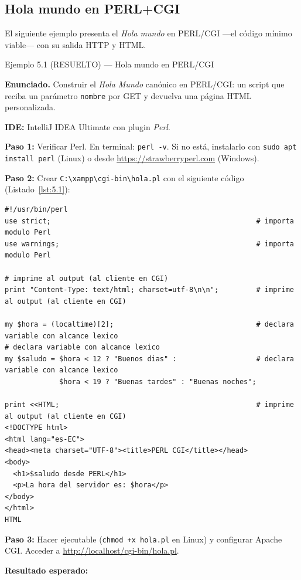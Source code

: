 \documentclass[11pt,a4paper,openany]{book}
\begin{document}
\subsection{Hola mundo en PERL+CGI}

El siguiente ejemplo presenta el \emph{Hola mundo} en
PERL/CGI ---el código mínimo viable--- con su salida HTTP y HTML.


\begin{cajaejemplo}{Ejemplo 5.1 (RESUELTO) --- Hola mundo en PERL/CGI}


\textbf{Enunciado.} Construir el \emph{Hola Mundo} canónico en PERL/CGI: un script que reciba un parámetro \texttt{nombre} por GET y devuelva una página HTML personalizada.

\textbf{IDE:} IntelliJ IDEA Ultimate con plugin \emph{Perl}.

\textbf{Paso 1:} Verificar Perl. En terminal: \texttt{perl -v}. Si no
está, instalarlo con \texttt{sudo apt install perl} (Linux) o desde
\url{https://strawberryperl.com} (Windows).

\textbf{Paso 2:} Crear \texttt{C:\textbackslash{}xampp\textbackslash{}cgi-bin\textbackslash{}hola.pl}
con el siguiente código (Listado~\ref{lst:5.1}):

\begin{lstlisting}[style=perl,caption={hola.pl},label=lst:5.1]
#!/usr/bin/perl
use strict;                                                 # importa modulo Perl
use warnings;                                               # importa modulo Perl

# imprime al output (al cliente en CGI)
print "Content-Type: text/html; charset=utf-8\n\n";         # imprime al output (al cliente en CGI)

my $hora = (localtime)[2];                                  # declara variable con alcance lexico
# declara variable con alcance lexico
my $saludo = $hora < 12 ? "Buenos dias" :                   # declara variable con alcance lexico
             $hora < 19 ? "Buenas tardes" : "Buenas noches";

print <<HTML;                                               # imprime al output (al cliente en CGI)
<!DOCTYPE html>
<html lang="es-EC">
<head><meta charset="UTF-8"><title>PERL CGI</title></head>
<body>
  <h1>$saludo desde PERL</h1>
  <p>La hora del servidor es: $hora</p>
</body>
</html>
HTML
\end{lstlisting}

\textbf{Paso 3:} Hacer ejecutable
(\texttt{chmod +x hola.pl} en Linux) y configurar Apache CGI.
Acceder a \url{http://localhost/cgi-bin/hola.pl}.

\textbf{Resultado esperado:}

\end{cajaejemplo}
\end{document}
